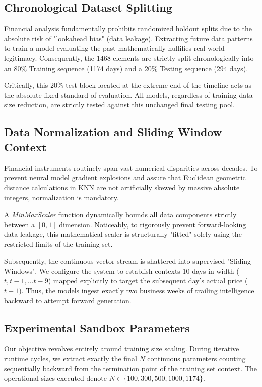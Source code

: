 \documentclass[12pt,onecolumn]{IEEEtran}
\begin{document}
\subsection{Chronological Dataset Splitting}
Financial analysis fundamentally prohibits randomized holdout splits due to the absolute risk of "lookahead bias" (data leakage). Extracting future data patterns to train a model evaluating the past mathematically nullifies real-world legitimacy. Consequently, the 1468 elements are strictly split chronologically into an 80\% Training sequence (1174 days) and a 20\% Testing sequence (294 days).

Critically, this 20\% test block located at the extreme end of the timeline acts as the absolute fixed standard of evaluation. All models, regardless of training data size reduction, are strictly tested against this unchanged final testing pool.

\subsection{Data Normalization and Sliding Window Context}
Financial instruments routinely span vast numerical disparities across decades. To prevent neural model gradient explosions and assure that Euclidean geometric distance calculations in KNN are not artificially skewed by massive absolute integers, normalization is mandatory. 

A \textit{MinMaxScaler} function dynamically bounds all data components strictly between a $[0, 1]$ dimension. Noticeably, to rigorously prevent forward-looking data leakage, this mathematical scaler is structurally "fitted" solely using the restricted limits of the training set.

Subsequently, the continuous vector stream is shattered into supervised "Sliding Windows". We configure the system to establish contexts 10 days in width ($t, t-1, ... t-9$) mapped explicitly to target the subsequent day's actual price ($t+1$). Thus, the models ingest exactly two business weeks of trailing intelligence backward to attempt forward generation.

\subsection{Experimental Sandbox Parameters}
Our objective revolves entirely around training size scaling. During iterative runtime cycles, we extract exactly the final $N$ continuous parameters counting sequentially backward from the termination point of the training set context. The operational sizes executed denote $N \in \{100, 300, 500, 1000, 1174\}$. 
\end{document}
